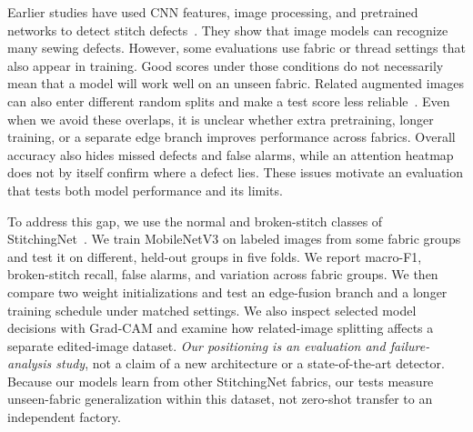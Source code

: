 \documentclass[conference,a4paper]{IEEEtran}
\begin{document}
Earlier studies have used CNN features, image processing, and pretrained networks to detect stitch defects~\cite{kim2022,chowdhury2024,jung2025}. They show that image models can recognize many sewing defects. However, some evaluations use fabric or thread settings that also appear in training. Good scores under those conditions do not necessarily mean that a model will work well on an unseen fabric. Related augmented images can also enter different random splits and make a test score less reliable~\cite{shorten2019,kapoor2023,gerz2026}. Even when we avoid these overlaps, it is unclear whether extra pretraining, longer training, or a separate edge branch improves performance across fabrics. Overall accuracy also hides missed defects and false alarms, while an attention heatmap does not by itself confirm where a defect lies. These issues motivate an evaluation that tests both model performance and its limits.

To address this gap, we use the normal and broken-stitch classes of StitchingNet~\cite{jung2025}. We train MobileNetV3 on labeled images from some fabric groups and test it on different, held-out groups in five folds. We report macro-F1, broken-stitch recall, false alarms, and variation across fabric groups. We then compare two weight initializations and test an edge-fusion branch and a longer training schedule under matched settings. We also inspect selected model decisions with Grad-CAM and examine how related-image splitting affects a separate edited-image dataset. \emph{Our positioning is an evaluation and failure-analysis study}, not a claim of a new architecture or a state-of-the-art detector. Because our models learn from other StitchingNet fabrics, our tests measure unseen-fabric generalization within this dataset, not zero-shot transfer to an independent factory.
\end{document}
